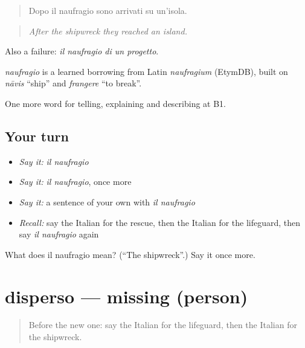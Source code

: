 \begin{quote}
Dopo il naufragio sono arrivati su un'isola.
\end{quote}

\begin{quote}
\emph{After the shipwreck they reached an island.}
\end{quote}

Also a failure: \emph{il naufragio di un progetto}.

\begin{cousinweb}
\emph{naufragio} is a learned borrowing from Latin \emph{naufragium} (EtymDB), built on \emph{nāvis} \textquotedblleft{}ship\textquotedblright{} and \emph{frangere} \textquotedblleft{}to break\textquotedblright{}.
\end{cousinweb}

\begin{grammarlens}[title={What you've built}]
One more word for telling, explaining and describing at B1.
\end{grammarlens}

\subsection*{Your turn}
\begin{itemize}
\raggedright
  \item \emph{Say it:} \emph{il naufragio}
  \item \emph{Say it:} \emph{il naufragio}, once more
  \item \emph{Say it:} a sentence of your own with \emph{il naufragio}
  \item \emph{Recall:} say the Italian for the rescue, then the Italian for the lifeguard, then say \emph{il naufragio} again
\end{itemize}

\begin{tcolorbox}[breakable,colback=teal!4,colframe=teal!35!black,title={Before you move on}]
What does il naufragio mean? (\textquotedblleft{}The shipwreck\textquotedblright{}.) Say it once more.
\end{tcolorbox}
\section[disperso]{disperso — missing (person)}

\label{lesson:IT-C306-disperso}



\begin{quote}
Before the new one: say the Italian for the lifeguard, then the Italian for the shipwreck.
\end{quote}

